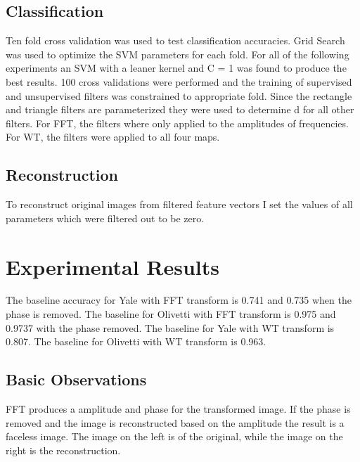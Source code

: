 \documentclass[12pt, letterpaper]{article}
\begin{document}
\subsection{Classification}

Ten fold cross validation was used to test classification accuracies. Grid Search was used to optimize the SVM parameters for each fold. For all of the following experiments an SVM with a leaner kernel and C = 1 was found to produce the best results. 100 cross validations were performed and the training of supervised and unsupervised filters was constrained to appropriate fold. Since the rectangle and triangle filters are parameterized they were used to determine d for all other filters. For FFT, the filters where only applied to the amplitudes of frequencies. For WT, the filters were applied to all four maps.     

\subsection{Reconstruction}

To reconstruct original images from filtered feature vectors I set the values of all parameters which were filtered out to be zero.  

\clearpage

\section{Experimental Results}

The baseline accuracy for Yale with FFT transform is 0.741 and 0.735 when the phase is removed. The baseline for Olivetti with FFT transform is 0.975 and 0.9737 with the phase removed. The baseline for Yale with WT transform is 0.807. The baseline for Olivetti with WT transform is 0.963.    

\subsection{Basic Observations}

FFT produces a amplitude and phase for the transformed image. If the phase is removed and the image is reconstructed based on the amplitude the result is a faceless image. The image on the left is of the original, while the image on the right is the reconstruction.   
\end{document}
